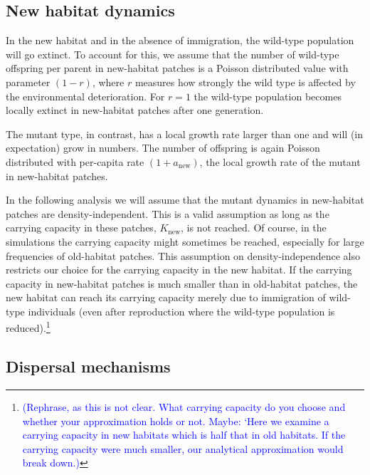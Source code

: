 \documentclass[a4paper,11pt]{article}
\newcommand{\francois}[1]{\textcolor{blue}{(#1)}}
\newcommand{\chg}[1]{\textcolor{change}{#1}}
\begin{document}
\subsection*{New habitat dynamics}
In the new habitat and in the absence of immigration, the wild-type population will go extinct. To account for this, we assume that the number of wild-type offspring \chg{per parent} in new-habitat patches is a Poisson distributed value with parameter $(1-r)$, where $r$ measures how strongly the wild type is affected by the environmental deterioration. For $r=1$ the wild-type population becomes locally extinct in new-habitat patches after one generation.

The mutant type, in contrast, has a local growth rate larger than one and will (in expectation) grow in numbers. The number of offspring is again Poisson distributed with per-capita rate $(1+a_{\text{new}})$, the local growth rate of the mutant in new-habitat patches. 

\chg{In the following analysis we will assume that the mutant dynamics in new-habitat patches are density-independent. This is a valid assumption as long as the carrying capacity in these patches, $K_{\text{new}}$, is not reached. Of course, in the simulations the carrying capacity might sometimes be reached, especially for large frequencies of old-habitat patches. This assumption on density-independence also restricts our choice for the carrying capacity in the new habitat. If the carrying capacity in new-habitat patches is much smaller than in old-habitat patches, the new habitat can reach its carrying capacity merely due to immigration of wild-type individuals (even after reproduction where the wild-type population is reduced).\footnote{\francois{Rephrase, as this is not clear. What carrying capacity do you choose and whether your approximation holds or not. Maybe: `Here we examine a carrying capacity in new habitats which is half that in old habitats. If the carrying capacity were much smaller, our analytical approximation would break down.}}}


\subsection*{Dispersal mechanisms}
\end{document}
